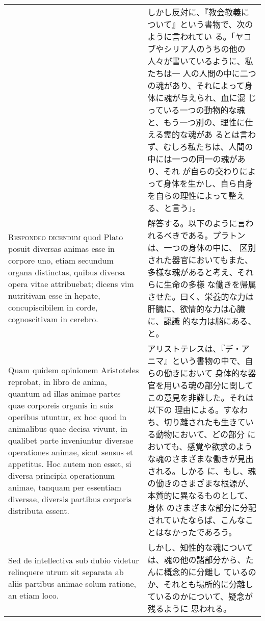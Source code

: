 \documentclass[paper=a4paper,fontsize=10pt,jafontsize=9pt,titlepage]{jlreq}
\begin{document}
\begin{longtable}{p{21em}p{21em}}
&

 しかし反対に、『教会教義について』という書物で、次のように言われてい
 る。「ヤコブやシリア人のうちの他の人々が書いているように、私たちは一
 人の人間の中に二つの魂があり、それによって身体に魂が与えられ、血に混
 じっている一つの動物的な魂と、もう一つ別の、理性に仕える霊的な魂があ
 るとは言わず、むしろ私たちは、人間の中には一つの同一の魂があり、それ
 が自らの交わりによって身体を生かし、自ら自身を自らの理性によって整え
 る、と言う」。
 
\\



{\scshape Respondeo dicendum} quod Plato posuit diversas animas esse
in corpore uno, etiam secundum organa distinctas, quibus diversa opera
vitae attribuebat; dicens vim nutritivam esse in hepate,
concupiscibilem in corde, cognoscitivam in cerebro.

&

解答する。以下のように言われるべきである。プラトンは、一つの身体の中に、
区別された器官においてもまた、多様な魂があると考え、それらに生命の多様
な働きを帰属させた。曰く、栄養的な力は肝臓に、欲情的な力は心臓に、認識
的な力は脳にある、と。
 
\\

Quam quidem opinionem Aristoteles reprobat, in libro de anima, quantum
ad illas animae partes quae corporeis organis in suis operibus
utuntur, ex hoc quod in animalibus quae decisa vivunt, in qualibet
parte inveniuntur diversae operationes animae, sicut sensus et
appetitus. Hoc autem non esset, si diversa principia operationum
animae, tanquam per essentiam diversae, diversis partibus corporis
distributa essent.

&

 アリストテレスは、『デ・アニマ』という書物の中で、自らの働きにおいて
 身体的な器官を用いる魂の部分に関してこの意見を非難した。それは以下の
 理由による。すなわち、切り離されたも生きている動物において、どの部分
 においても、感覚や欲求のような魂のさまざまな働きが見出される。しかる
 に、もし、魂の働きのさまざまな根源が、本質的に異なるものとして、身体
 のさまざまな部分に分配されていたならば、こんなことはなかったであろう。
 
\\

 Sed de intellectiva sub dubio videtur relinquere utrum sit
separata ab aliis partibus animae solum ratione, an etiam loco.

&

しかし、知性的な魂については、魂の他の諸部分から、たんに概念的に分離し
ているのか、それとも場所的に分離しているのかについて、疑念が残るように
思われる。
 

\end{longtable}
\end{document}
